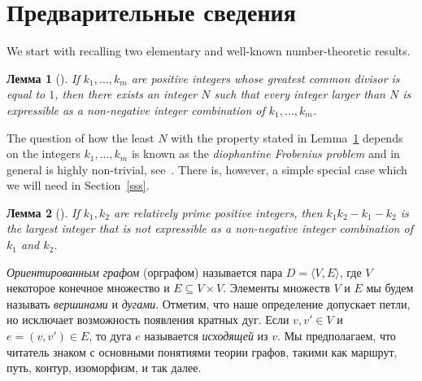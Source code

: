 \documentclass[11pt]{article}
\newtheorem{lemma}{Лемма}
\begin{document}
\section{Предварительные сведения}
\label{preliminaries}

We start with recalling two elementary and well-known number-theoretic results.
\begin{lemma}[{\mdseries\cite[Theorem 1.0.1]{RaAl05}}]
\label{schur}
If $k_1,\dots,k_m$ are positive integers whose greatest common divisor is equal
to\/ $1$, then there exists an integer $N$ such that every integer larger than $N$
is expressible as a non-negative integer combination of $k_1,\dots,k_m$.
\end{lemma}
The question of how the least $N$ with the property stated in Lemma~\ref{schur}
depends on the integers $k_1,\dots,k_m$ is known as the \emph{diophantine Frobenius
problem} and in general is highly non-trivial, see~\cite{RaAl05}. There is, however,
a simple special case which we will need in Section~\ref{sss}.
\begin{lemma}[{\mdseries\cite[Theorem 2.1.1]{RaAl05}}]
\label{sylvester}
If $k_1,k_2$ are relatively prime positive integers, then $k_1k_2-k_1-k_2$ is
the largest integer that is not expressible as a non-negative integer combination
of $k_1$ and $k_2$.
\end{lemma}


\emph{Ориентированным графом} (орграфом) называется пара $D=\langle V,E\rangle$,
где $V$ некоторое конечное множество и $E\subseteq V\times V$. 
Элементы множеств $V$ и $E$ мы будем называть \emph{вершинами} и \emph{дугами}. 
Отметим, что наше определение допускает петли, но исключает возможность появления
кратных дуг. Если $v,v'\in V$ и $e=(v,v')\in E$, то дуга $e$ называется
\emph{исходящей} из $v$. Мы предполагаем, что читатель знаком с основными понятиями
теории графов, такими как маршрут,
путь, контур, изоморфизм, и так далее.


\end{document}

